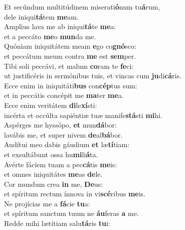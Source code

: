 \evenverse Et secúndum multitúdinem miserati\textbf{ó}num tu\textbf{á}rum,~\*\\
\evenverse dele iniqui\textbf{tá}tem \textbf{me}am.\\
\oddverse Amplius lava me ab iniqui\textbf{tá}te \textbf{me}a:~\*\\
\oddverse et a peccáto \textbf{me}o \textbf{mun}da me.\\
\evenverse Quóniam iniquitátem meam \textbf{e}go co\textbf{gnó}sco:~\*\\
\evenverse et peccátum meum contra \textbf{me} est \textbf{sem}per.\\
\oddverse Tibi soli peccávi, et malum \textbf{co}ram te \textbf{fe}ci:~\*\\
\oddverse ut justificéris in sermónibus tuis, et vincas cum \textbf{ju}di\textbf{cá}ris.\\
\evenverse Ecce enim in iniquitáti\textbf{bus} con\textbf{cép}tus sum:~\*\\
\evenverse et in peccátis concépit me \textbf{ma}ter \textbf{me}a.\\
\oddverse Ecce enim veritátem \textbf{di}le\textbf{xí}sti:~\*\\
\oddverse incérta et occúlta sapiéntiæ tuæ manife\textbf{stá}sti \textbf{mi}hi.\\
\evenverse Aspérges me hyssópo, \textbf{et} mun\textbf{dá}bor:~\*\\
\evenverse lavábis me, et super nivem \textbf{de}al\textbf{bá}bor.\\
\oddverse Audítui meo dabis gáudium \textbf{et} læ\textbf{tí}tiam:~\*\\
\oddverse et exsultábunt ossa hu\textbf{mi}li\textbf{á}ta.\\
\evenverse Avérte fáciem tuam a pec\textbf{cá}tis \textbf{me}is:~\*\\
\evenverse et omnes iniquitátes \textbf{me}as \textbf{de}le.\\
\oddverse Cor mundum crea \textbf{in} me, \textbf{De}us:~\*\\
\oddverse et spíritum rectum ínnova in vi\textbf{scé}ribus \textbf{me}is.\\
\evenverse Ne projícias me a \textbf{fá}cie \textbf{tu}a:~\*\\
\evenverse et spíritum sanctum tuum ne \textbf{áu}feras \textbf{a} me.\\
\oddverse Redde mihi lætítiam salu\textbf{tá}ris \textbf{tu}i:~\*\\
